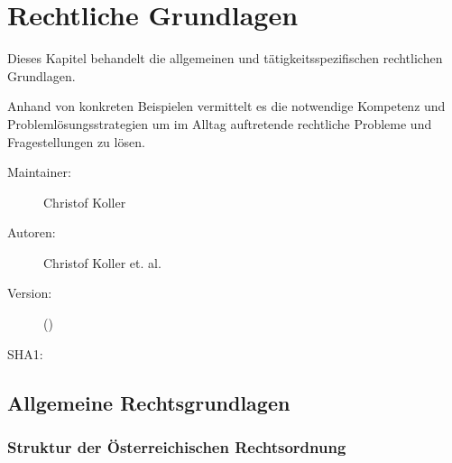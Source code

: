 \def\ChapterCode{JUS}
\chapter
[\CO{[JUS]} Rechtliche Grundlagen]
{Rechtliche Grundlagen}
\label{chp:JUS}

\setcounter{tocdepth}{10}
\ChapterIntro
{%
Dieses Kapitel behandelt die allgemeinen und
tätigkeitsspezifischen rechtlichen Grundlagen. 

Anhand von konkreten Beispielen vermittelt es die notwendige
Kompetenz und Problemlösungsstrategien um im Alltag
auftretende rechtliche Probleme und Fragestellungen zu
lösen.
}
{%
\begin{description}
  \item[Maintainer:] Christof Koller
  \item[Autoren:] Christof Koller et. al.
  \item[Version:] {\DocVersion} ({\DocVersionInfo})
  \item[SHA1:] {\DocGitCommit}
\end{description}

{\TxTeilkapitelAASS}
}
{}
% 
% 





\clearpage
\section{Allgemeine Rechtsgrundlagen}



\subsection{Struktur der Österreichischen Rechtsordnung}




